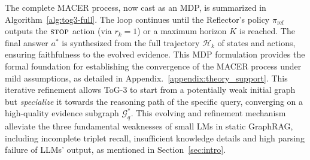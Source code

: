 The complete MACER process, now cast as an MDP, is summarized in Algorithm~\ref{alg:tog3-full}. The loop continues until the Reflector's policy $\pi_{\text{ref}}$ outputs the $\textsc{stop}$ action (via $r_k=1$) or a maximum horizon $K$ is reached. The final answer $a^*$ is synthesized from the full trajectory $\mathcal{H}_k$ of states and actions, ensuring faithfulness to the evolved evidence.
This MDP formulation provides the formal foundation for establishing the convergence of the MACER process under mild assumptions, as detailed in Appendix.~\ref{appendix:theory_support}.
This iterative refinement allows ToG-3 to start from a potentially weak initial graph but \emph{specialize} it towards the reasoning path of the specific query, converging on a high-quality evidence subgraph $\mathcal{G}^*_q$. 
This evolving and refinement mechanism alleviate the three fundamental weaknesses of small LMs in static GraphRAG, including incomplete triplet recall, insufficient knowledge details and high parsing failure of LLMs' output, as mentioned in Section~\ref{sec:intro}. 


